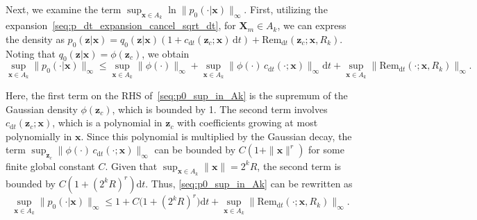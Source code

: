 \documentclass[
 longbibliography,
 twocolumn,
 superscriptaddress,
 amsmath,
 amssymb,
 amsthm,
 amsfonts,
 prl,
 floatfix,
]{revtex4-2}
\begin{document}
\begin{widetext}
Next, we examine the term $\sup_{\bm x\in A_k}\ln\|p_0(\cdot|\bm x)\|_\infty$. First, utilizing the expansion~\eqref{seq:p_dt_expansion_cancel_sqrt_dt}, for $\bm X_m\in A_k$, we can express the density as $p_0(\bm z|\bm x)=q_0(\bm z|\bm x)(1+c_{\mathrm dt}(\bm z_c;\bm x)\,\mathrm dt)+\mathrm{Rem}_{\mathrm dt}(\bm z_c;\bm x,R_k)$. Noting that $q_0(\bm z|\bm x)=\phi(\bm z_c)$, we obtain
\begin{equation}
    \sup_{\bm x\in A_k}
    \|p_0(\cdot|\bm x)\|_\infty
    \leq
    \sup_{\bm x\in A_k}
    \|\phi(\cdot)\|_\infty
    +\sup_{\bm x\in A_k}
    \|\phi(\cdot)\,c_{\mathrm dt}(\cdot;\bm x)\|_\infty\mathrm dt
    +\sup_{\bm x\in A_k}
    \|\mathrm{Rem}_{\mathrm dt}(\cdot;\bm x,R_k)\|_\infty.
    \label{seq:p0_sup_in_Ak}
\end{equation}

Here, the first term on the RHS of~\eqref{seq:p0_sup_in_Ak} is the supremum of the Gaussian density $\phi(\bm z_c)$, which is bounded by 1. The second term involves $c_{\mathrm dt}(\bm z_c;\bm x)$, which is a polynomial in $\bm z_c$ with coefficients growing at most polynomially in $\bm x$. Since this polynomial is multiplied by the Gaussian decay, the term $\sup_{\bm z_c}\|\phi(\cdot)\,c_{\mathrm dt}(\cdot;\bm x)\|_\infty$ can be bounded by $C(1+\|\bm x\|^r)$ for some finite global constant $C$. Given that $\sup_{\bm x\in A_k}\!\|\bm x\|=2^k R$, the second term is bounded by $C(1+(2^kR)^r)\mathrm dt$. Thus, \eqref{seq:p0_sup_in_Ak} can be rewritten as
\begin{equation}
    \sup_{\bm x\in A_k}
    \|p_0(\cdot|\bm x)\|_\infty
    \leq
    1
    +C\big(1+(2^kR)^r\big)\mathrm dt
    +\sup_{\bm x\in A_k}
    \|\mathrm{Rem}_{\mathrm dt}(\cdot;\bm x,R_k)\|_\infty.
    \label{seq:p0_sup_in_Ak_second}
\end{equation}


\end{widetext}
\end{document}
